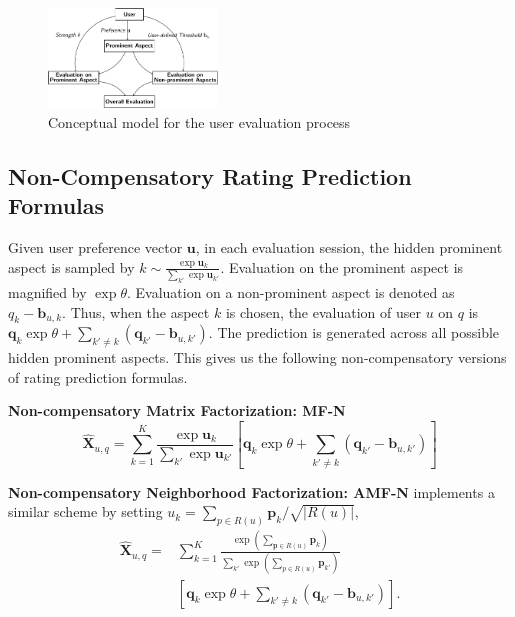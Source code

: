 \documentclass[letterpaper]{article} %
\begin{document}
 \begin{figure}[htbp]
\begin{center}
\includegraphics[width=0.4\textwidth]{conceptualmodel.pdf}
\caption{Conceptual model for the user evaluation process}
\label{fig:model}
\end{center}
\end{figure}


\subsection{Non-Compensatory Rating Prediction Formulas}
Given user preference vector $\mathbf{u}$, in each evaluation session, the hidden prominent aspect is sampled by $k\sim \frac{\exp \mathbf{u}_k}{\sum_{k'} \exp \mathbf{u}_{k'}} $. Evaluation on the prominent aspect is magnified by  $\exp \theta$. Evaluation on a non-prominent aspect is denoted as $q_k-\mathbf{b}_{u,k}$. Thus, when the aspect $k$ is chosen, the evaluation of user $u$ on $q$ is $\mathbf{q}_k \exp\theta  + \sum_{k'\neq k} (\mathbf{q}_{k'}-\mathbf{b}_{u,k'})$. The prediction is generated across all possible hidden prominent aspects. This gives us the following non-compensatory versions of rating prediction formulas.

\textbf{Non-compensatory Matrix Factorization: MF-N} 
\begin{equation}\label{equ:MF-N}
 \hat{\mathbf{X}}_{u,q}=\sum_{k=1}^{K} \frac{\exp \mathbf{u}_k}{\sum_{k'} \exp \mathbf{u}_{k'}} [ \mathbf{q}_k  \exp\theta  + \sum_{k'\neq k} (\mathbf{q}_{k'}-\mathbf{b}_{u,k'}) ]
\end{equation}


\textbf{Non-compensatory Neighborhood Factorization: AMF-N} implements a similar scheme by setting $u_k =\sum_{p \in R(u)} \mathbf{p}_k/\sqrt{|R(u)|} $, 
\begin{eqnarray}\label{equ:AMF-N}
 \hat{\mathbf{X}}_{u,q}=&\sum_{k=1}^{K} \frac{\exp (\sum_{\mathbf{p} \in R(u)} \mathbf{p}_k )}{\sum_{k'} \exp  (\sum_{p \in R(u)} \mathbf{p}_{k'} ) } \\\nonumber
& [  \mathbf{q}_k \exp\theta + \sum_{k'\neq k} (\mathbf{q}_{k'}-\mathbf{b}_{u,k'}) ].
\end{eqnarray}
\end{document}
